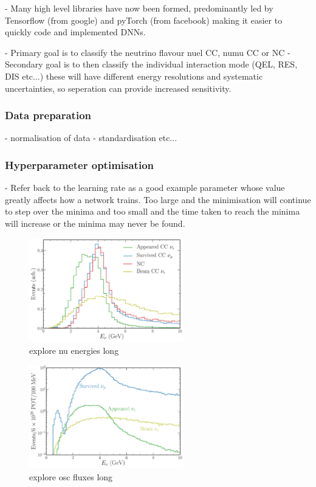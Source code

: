 - Many high level libraries have now been formed, predominantly led by Tensorflow (from google)
and pyTorch (from facebook) making it easier to quickly code and implemented DNNs.

- Primary goal is to classify the neutrino flavour nuel CC, numu CC or NC
- Secondary goal is to then classify the individual interaction mode (QEL, RES, DIS etc...) these
will have different energy resolutions and systematic uncertainties, so seperation can provide
increased sensitivity.

\subsubsection*{Data preparation}

- normalisation of data
- standardisation etc...

\subsubsection*{Hyperparameter optimisation}

- Refer back to the learning rate as a good example
parameter whose value greatly affects how a network trains. Too large and the minimisation will
continue to step over the minima and too small and the time taken to reach the minima will
increase or the minima may never be found.



\begin{figure} %
    \includegraphics[width=0.6\textwidth]{diagrams/6-cvn/chipsnet/explore_nu_energies.pdf}
    \caption[explore nu energies short]
    {explore nu energies long}
    \label{fig:explore_nu_energies}
\end{figure}

\begin{figure} %
    \includegraphics[width=0.6\textwidth]{diagrams/6-cvn/chipsnet/explore_osc_fluxes.pdf}
    \caption[explore osc fluxes short]
    {explore osc fluxes long}
    \label{fig:explore_osc_fluxes}
\end{figure}

